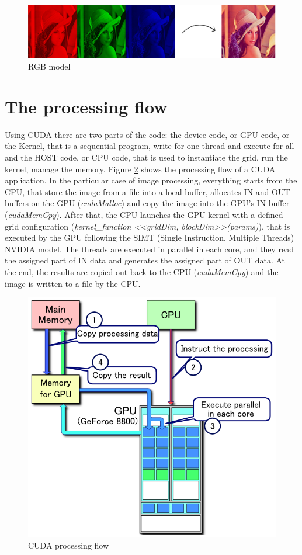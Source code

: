 \documentclass[a4paper]{article}
\begin{document}
\begin{figure}[ht]
    \centering
    \includegraphics[width=0.7\linewidth]{rgb}
    \caption{RGB model}
    \label{fig:rgb}
\end{figure}
\FloatBarrier

\section{The processing flow}
\label{sec:cpf}
Using CUDA there are two parts of the code: the device code, or GPU code, or the Kernel, that is a sequential program, write for one thread and execute for all and the HOST code, or CPU code, that is used to instantiate the grid, run the kernel, manage the memory. Figure \ref{fig:flow} shows the processing flow of a CUDA application. In the particular case of image processing, everything starts from the CPU, that store the image from a file into a local buffer, allocates IN and OUT buffers on the GPU (\textit{cudaMalloc}) and copy the image into the GPU's IN buffer (\textit{cudaMemCpy}). After that, the CPU launches the GPU kernel with a defined grid configuration (\textit{kernel\_function <<gridDim, blockDim>>(params)}), that is executed by the GPU following the SIMT (Single Instruction, Multiple Threads) NVIDIA model. The threads are executed in parallel in each core, and they read the assigned part of IN data and generates the assigned part of OUT data. At the end, the results are copied out back to the CPU (\textit{cudaMemCpy}) and the image is written to a file by the CPU.

\begin{figure}[ht]
    \centering
    \includegraphics[width=0.5\linewidth]{flow}
    \caption{CUDA processing flow}
    \label{fig:flow}
\end{figure}
\FloatBarrier
\end{document}
